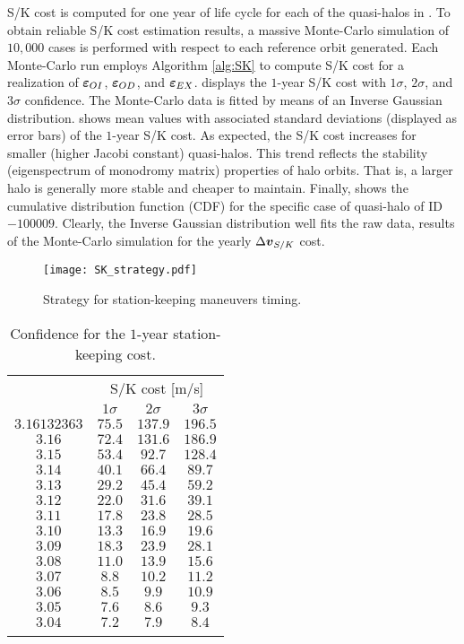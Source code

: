 S/K cost is computed for one year of life cycle for each of the quasi-halos in . To obtain reliable S/K cost estimation results, a massive Monte-Carlo simulation of $10,000$ cases is performed with respect to each reference orbit generated. Each Monte-Carlo run employs Algorithm \ref{alg:SK} to compute S/K cost for a realization of $\boldsymbol{\varepsilon}_{OI}$, $\boldsymbol{\varepsilon}_{OD}$, and $\boldsymbol{\varepsilon}_{EX}$.  displays the $1$-year S/K cost with $1\sigma$, $2\sigma$, and $3\sigma$ confidence. The Monte-Carlo data is fitted by means of an Inverse Gaussian distribution.  shows mean values with associated standard deviations (displayed as error bars) of the $1$-year S/K cost. As expected, the S/K cost increases for smaller (\ie higher Jacobi constant) quasi-halos. This trend reflects the stability (eigenspectrum of monodromy matrix) properties of halo orbits. That is, a larger halo is generally more stable and cheaper to maintain. Finally,  shows the cumulative distribution function (CDF) for the specific case of quasi-halo of ID $-100009$. Clearly, the Inverse Gaussian distribution well fits the raw data, results of the Monte-Carlo simulation for the yearly $\Delta\boldsymbol{v}_{S/K}$ cost.
%
\begin{figure*}[]
	\centering
	\texttt{[image: SK\_strategy.pdf]}
	\caption{Strategy for station-keeping maneuvers timing.}
	\label{fig:SK_strategy}
\end{figure*}
%
%
\begin{table}[]
	\caption{Confidence for the $1$-year station-keeping cost.}
	\label{tab:SKconfidence}
	\centering
	\begin{tabular}{cccc}
		\TOPlines
		\multirow{2}{*}{$C_j$ [adim]} & \multicolumn{3}{c}{S/K cost [m/s]} \\
		& $1\sigma$ & $2\sigma$ & $3\sigma$ \\
		\MIDline
		$3.16132363$ & $75.5$ & $137.9$ & $196.5$ \\
		$3.16$ & $72.4$ & $131.6$ & $186.9$ \\
		$3.15$ & $53.4$ & $92.7$ & $128.4$ \\
		$3.14$ & $40.1$ & $66.4$ & $89.7$ \\
		$3.13$ & $29.2$ & $45.4$ & $59.2$ \\
		$3.12$ & $22.0$ & $31.6$ & $39.1$ \\
		$3.11$ & $17.8$ & $23.8$ & $28.5$ \\
		$3.10$ & $13.3$ & $16.9$ & $19.6$ \\
		$3.09$ & $18.3$ & $23.9$ & $28.1$ \\
		$3.08$ & $11.0$ & $13.9$ & $15.6$ \\
		$3.07$ & $8.8$ & $10.2$ & $11.2$ \\
		$3.06$ & $8.5$ & $9.9$ & $10.9$ \\
		$3.05$ & $7.6$ & $8.6$ & $9.3$ \\
		$3.04$ & $7.2$ & $7.9$ & $8.4$ \\
		\BOTTOMlines
	\end{tabular}
\end{table}
